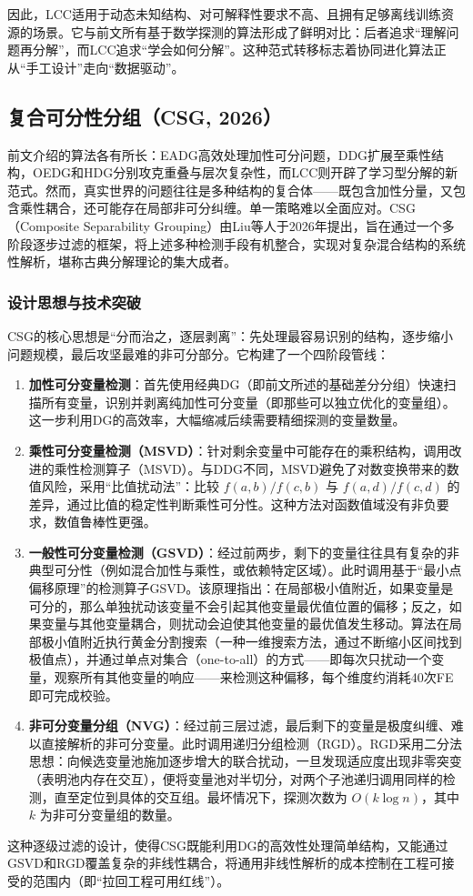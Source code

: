 因此，LCC适用于动态未知结构、对可解释性要求不高、且拥有足够离线训练资源的场景。它与前文所有基于数学探测的算法形成了鲜明对比：后者追求“理解问题再分解”，而LCC追求“学会如何分解”。这种范式转移标志着协同进化算法正从“手工设计”走向“数据驱动”。

\subsection{复合可分性分组（CSG, 2026）}

前文介绍的算法各有所长：EADG高效处理加性可分问题，DDG扩展至乘性结构，OEDG和HDG分别攻克重叠与层次复杂性，而LCC则开辟了学习型分解的新范式。然而，真实世界的问题往往是多种结构的复合体——既包含加性分量，又包含乘性耦合，还可能存在局部非可分纠缠。单一策略难以全面应对。CSG（Composite Separability Grouping）由Liu等人于2026年提出，旨在通过一个多阶段逐步过滤的框架，将上述多种检测手段有机整合，实现对复杂混合结构的系统性解析，堪称古典分解理论的集大成者。

\subsubsection{设计思想与技术突破}
CSG的核心思想是“分而治之，逐层剥离”：先处理最容易识别的结构，逐步缩小问题规模，最后攻坚最难的非可分部分。它构建了一个四阶段管线：
\begin{enumerate}
    \item \textbf{加性可分变量检测}：首先使用经典DG（即前文所述的基础差分分组）快速扫描所有变量，识别并剥离纯加性可分变量（即那些可以独立优化的变量组）。这一步利用DG的高效率，大幅缩减后续需要精细探测的变量数量。
    \item \textbf{乘性可分变量检测（MSVD）}：针对剩余变量中可能存在的乘积结构，调用改进的乘性检测算子（MSVD）。与DDG不同，MSVD避免了对数变换带来的数值风险，采用“比值扰动法”：比较 $f(a,b)/f(c,b)$ 与 $f(a,d)/f(c,d)$ 的差异，通过比值的稳定性判断乘性可分性。这种方法对函数值域没有非负要求，数值鲁棒性更强。
    \item \textbf{一般性可分变量检测（GSVD）}：经过前两步，剩下的变量往往具有复杂的非典型可分性（例如混合加性与乘性，或依赖特定区域）。此时调用基于“最小点偏移原理”的检测算子GSVD。该原理指出：在局部极小值附近，如果变量是可分的，那么单独扰动该变量不会引起其他变量最优值位置的偏移；反之，如果变量与其他变量耦合，则扰动会迫使其他变量的最优值发生移动。算法在局部极小值附近执行黄金分割搜索（一种一维搜索方法，通过不断缩小区间找到极值点），并通过单点对集合（one-to-all）的方式——即每次只扰动一个变量，观察所有其他变量的响应——来检测这种偏移，每个维度约消耗40次FE即可完成校验。
    \item \textbf{非可分变量分组（NVG）}：经过前三层过滤，最后剩下的变量是极度纠缠、难以直接解析的非可分变量。此时调用递归分组检测（RGD）。RGD采用二分法思想：向候选变量池施加逐步增大的联合扰动，一旦发现适应度出现非零突变（表明池内存在交互），便将变量池对半切分，对两个子池递归调用同样的检测，直至定位到具体的交互组。最坏情况下，探测次数为 $O(k \log n)$，其中 $k$ 为非可分变量组的数量。
\end{enumerate}
这种逐级过滤的设计，使得CSG既能利用DG的高效性处理简单结构，又能通过GSVD和RGD覆盖复杂的非线性耦合，将通用非线性解析的成本控制在工程可接受的范围内（即“拉回工程可用红线”）。

